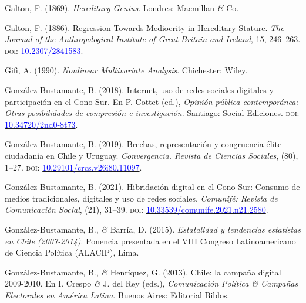 \documentclass[a4paper]{tufte-handout}
\begin{document}
\begin{list}{}
\item{\small Galton, F. (1869). {\itshape Hereditary Genius}. Londres: Macmillan {\itshape \&} Co.}

\item{\small Galton, F. (1886). Regression Towards Mediocrity in Hereditary Stature. {\itshape The Journal of the Anthropological Institute of Great Britain and Ireland}, 15, 246--263. {\scshape doi:} \href{https://doi.org/10.2307/2841583}{\textcolor{blue}{10.2307/2841583}}.}

\item{\small Gifi, A. (1990). {\itshape Nonlinear Multivariate Analysis}. Chichester: Wiley.}

\item{\small González-Bustamante, B. (2018). Internet, uso de redes sociales digitales y participación en el Cono Sur. En P. Cottet (ed.), {\itshape Opinión pública contemporánea: Otras posibilidades de compresión e investigación}. Santiago: Social-Ediciones. {\scshape doi:} \href{https://doi.org/10.34720/2nd0-8t73}{\textcolor{blue}{10.34720/2nd0-8t73}}.}

\item{\small González-Bustamante, B. (2019). Brechas, representación y congruencia élite-ciudadanía en Chile y Uruguay. {\itshape Convergencia. Revista de Ciencias Sociales}, (80), 1--27. {\scshape doi:} \href{https://doi.org/10.29101/crcs.v26i80.11097}{\textcolor{blue}{10.29101/crcs.v26i80.11097}}.}

\item{\small González-Bustamante, B. (2021). Hibridación digital en el Cono Sur: Consumo de medios tradicionales, digitales y uso de redes sociales. {\itshape Comunifé: Revista de Comunicación Social}, (21), 31--39. {\scshape doi:} \href{https://doi.org/10.33539/comunife.2021.n21.2580}{\textcolor{blue}{10.33539/comunife.2021.n21.2580}}.}

\item{\small González-Bustamante, B., {\itshape \&} Barría, D. (2015). {\itshape Estatalidad y tendencias estatistas en Chile (2007-2014)}. Ponencia presentada en el VIII Congreso Latinoamericano de Ciencia Política (ALACIP), Lima.}

\item{\small González-Bustamante, B., {\itshape \&} Henríquez, G. (2013). Chile: la campaña digital 2009-2010. En I. Crespo {\itshape \&} J. del Rey (eds.), {\itshape Comunicación Política \& Campañas Electorales en América Latina}. Buenos Aires: Editorial Biblos.}


\end{list}
\end{document}

